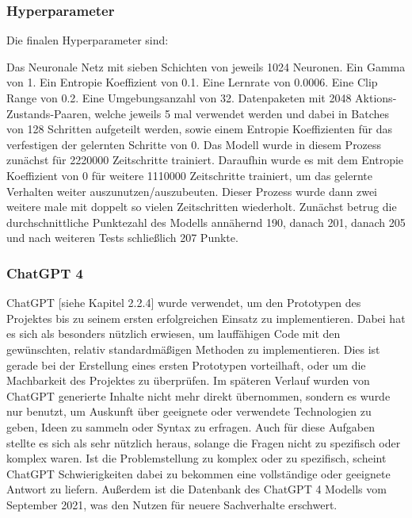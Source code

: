 \subsubsection{Hyperparameter}
Die finalen Hyperparameter sind:

Das Neuronale Netz mit sieben Schichten von jeweils 1024 Neuronen. Ein Gamma von 1. Ein Entropie Koeffizient von 0.1. Eine Lernrate von 0.0006. Eine Clip Range von 0.2. Eine Umgebungsanzahl von 32. Datenpaketen mit 2048 Aktions-Zustands-Paaren, welche jeweils 5 mal verwendet werden und dabei in Batches von 128 Schritten aufgeteilt werden, sowie einem Entropie Koeffizienten für das verfestigen der gelernten Schritte von 0. Das Modell wurde in diesem Prozess zunächst für 2220000 Zeitschritte trainiert. Daraufhin wurde es mit dem Entropie Koeffizient von 0 für weitere 1110000 Zeitschritte trainiert, um das gelernte Verhalten weiter auszunutzen/auszubeuten. Dieser Prozess wurde dann zwei weitere male mit doppelt so vielen Zeitschritten wiederholt. Zunächst betrug die durchschnittliche Punktezahl des Modells annähernd 190, danach 201, danach 205 und nach weiteren Tests schließlich 207 Punkte.

\subsubsection{ChatGPT 4}
ChatGPT [siehe Kapitel 2.2.4] wurde verwendet, um den Prototypen des Projektes bis zu seinem ersten erfolgreichen Einsatz zu implementieren. Dabei hat es sich als besonders nützlich erwiesen, um lauffähigen Code mit den gewünschten, relativ standardmäßigen Methoden zu implementieren. Dies ist gerade bei der Erstellung eines ersten Prototypen vorteilhaft, oder um die Machbarkeit des Projektes zu überprüfen. Im späteren Verlauf wurden von ChatGPT generierte Inhalte nicht mehr direkt übernommen, sondern es wurde nur benutzt, um Auskunft über geeignete oder verwendete Technologien zu geben, Ideen zu sammeln oder Syntax zu erfragen. Auch für diese Aufgaben stellte es sich als sehr nützlich heraus, solange die Fragen nicht zu spezifisch oder komplex waren. Ist die Problemstellung zu komplex oder zu spezifisch, scheint ChatGPT Schwierigkeiten dabei zu bekommen eine vollständige oder geeignete Antwort zu liefern. Außerdem ist die Datenbank des ChatGPT 4 Modells vom September 2021, was den Nutzen für neuere Sachverhalte erschwert.